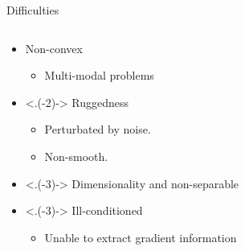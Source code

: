 \begin{frame}{Difficulties}
  \begin{columns}
    \begin{column}{0.6\textwidth}
      \begin{itemize}[<+->]
        \item Non-convex
          \begin{itemize}
            \item Multi-modal problems
          \end{itemize}
        \item <.(-2)-> Ruggedness
          \begin{itemize}  
            \item Perturbated by noise. 
            \item Non-smooth.
          \end{itemize}
        \item <.(-3)-> Dimensionality and non-separable
        \item <.(-3)-> Ill-conditioned
          \begin{itemize}
            \item Unable to extract gradient information
          \end{itemize}
      \end{itemize}
    \end{column}
    \begin{column}{0.4\textwidth}
    \end{column}
  \end{columns}
\end{frame}
